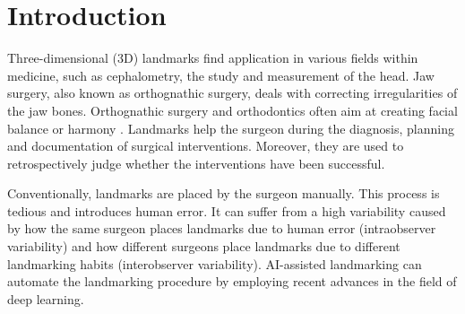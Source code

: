 
% 

 
 




\section{Introduction}
\label{sec:introduction}
Three-dimensional (3D) landmarks find application in various fields within medicine, such as cephalometry, the study and measurement of the head. Jaw surgery, also known as orthognathic surgery, deals with correcting irregularities of the jaw bones. Orthognathic surgery and orthodontics often aim at creating facial balance or harmony \cite{Plooij2009}. Landmarks help the surgeon during the diagnosis, planning and documentation of surgical interventions. Moreover, they are used to retrospectively judge whether the interventions have been successful. %

Conventionally, landmarks are placed by the surgeon %
manually. This process is tedious and introduces human error. It can suffer from a high variability caused by how the same surgeon places landmarks due to human error (intraobserver variability) and how different surgeons place landmarks due to different landmarking habits (interobserver variability).
AI-assisted landmarking can automate the landmarking procedure by employing recent advances in the field of deep learning.

